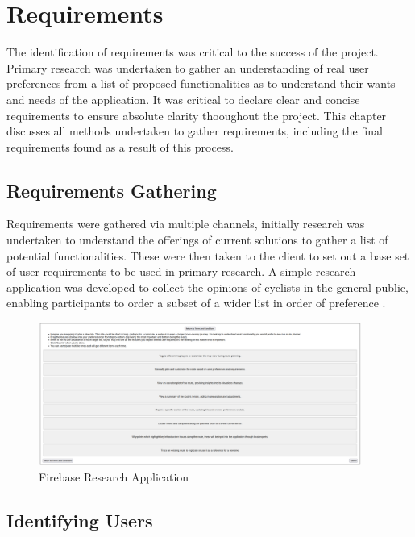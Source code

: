 \setlength{\tabcolsep}{20pt}
\renewcommand{\arraystretch}{1.5}

\chapter{Requirements}
\label{chap:requirements}

The identification of requirements was critical to the success of the project. Primary research was undertaken to gather an understanding of real user preferences from a list of proposed functionalities as to understand their wants and needs of the application. It was critical to declare clear and concise requirements to ensure absolute clarity thooughout the project. This chapter discusses all methods undertaken to gather requirements, including the final requirements found as a result of this process.

\section{Requirements Gathering}
\label{requirements:gathering}

Requirements were gathered via multiple channels, initially research was undertaken to understand the offerings of current solutions to gather a list of potential functionalities. These were then taken to the client to set out a base set of user requirements to be used in primary research. A simple research application was developed to collect the opinions of cyclists in the general public, enabling participants to order a subset of a wider list in order of preference .

\begin{figure}
  \centering
  \includegraphics[width=400px]{figures/research-application.png}
  \caption{Firebase Research Application}
  \label{fig:researchapp}
\end{figure}

\section{Identifying Users}
\label{requirements:identifyingusers}

